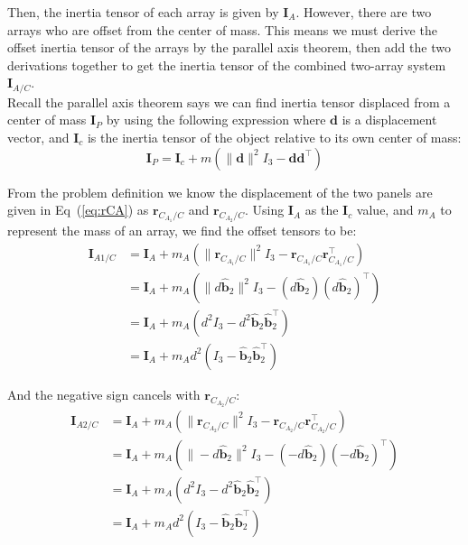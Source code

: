 \documentclass[titlepage]{article}
\begin{document}
Then, the inertia tensor of each array is given by $\boldsymbol{I}_A$. However, there are two arrays who are offset from the center of mass. This means we must derive the offset inertia tensor of the arrays by the parallel axis theorem, then add the two derivations together to get the inertia tensor of the combined two-array system $\boldsymbol{I}_{A/C}$.\\

Recall the parallel axis theorem says we can find inertia tensor displaced from a center of mass $\boldsymbol{I}_P$ by using the following expression where $\boldsymbol{d}$ is a displacement vector, and $\boldsymbol{I}_c$ is the inertia tensor of the object relative to its own center of mass:
\begin{equation}
	\boldsymbol{I}_P=\boldsymbol{I}_c+m(\|\boldsymbol{d}\|^2I_3-\boldsymbol{d}\boldsymbol{d}^\top)
\end{equation}

From the problem definition we know the displacement of the two panels are given in Eq~(\ref{eq:rCA}) as $\boldsymbol{r}_{C_{A_1}/C}$ and $\boldsymbol{r}_{C_{A_2}/C}$. Using $\boldsymbol{I}_A$ as the $\boldsymbol{I}_c$ value, and $m_A$ to represent the mass of an array, we find the offset tensors to be:
\begin{equation}
	\begin{split}
		\boldsymbol{I}_{A1/C}&=\boldsymbol{I}_A+m_A\left(\|\boldsymbol{r}_{C_{A_1}/C}\|^2I_3-\boldsymbol{r}_{C_{A_1}/C}\boldsymbol{r}_{C_{A_1}/C}^\top\right) \\
		&=\boldsymbol{I}_A+m_A\left(\|d\hat{\boldsymbol{b}}_2\|^2I_3-(d\hat{\boldsymbol{b}}_2)(d\hat{\boldsymbol{b}}_2)^\top\right) \\
		&=\boldsymbol{I}_A+m_A\left(d^2I_3-d^2\hat{\boldsymbol{b}}_2\hat{\boldsymbol{b}}_2^\top\right) \\
		&=\boldsymbol{I}_A+m_Ad^2\left(I_3-\hat{\boldsymbol{b}}_2\hat{\boldsymbol{b}}_2^\top\right)
	\end{split}
\end{equation}

And the negative sign cancels with $\boldsymbol{r}_{C_{A_2}/C}$:
\begin{equation}
	\begin{split}
		\boldsymbol{I}_{A2/C}&=\boldsymbol{I}_A+m_A\left(\|\boldsymbol{r}_{C_{A_2}/C}\|^2I_3-\boldsymbol{r}_{C_{A_2}/C}\boldsymbol{r}_{C_{A_2}/C}^\top\right) \\
		&=\boldsymbol{I}_A+m_A\left(\|-d\hat{\boldsymbol{b}}_2\|^2I_3-(-d\hat{\boldsymbol{b}}_2)(-d\hat{\boldsymbol{b}}_2)^\top\right) \\
		&=\boldsymbol{I}_A+m_A\left(d^2I_3-d^2\hat{\boldsymbol{b}}_2\hat{\boldsymbol{b}}_2^\top\right) \\
		&=\boldsymbol{I}_A+m_Ad^2\left(I_3-\hat{\boldsymbol{b}}_2\hat{\boldsymbol{b}}_2^\top\right)
	\end{split}
\end{equation}
\end{document}
